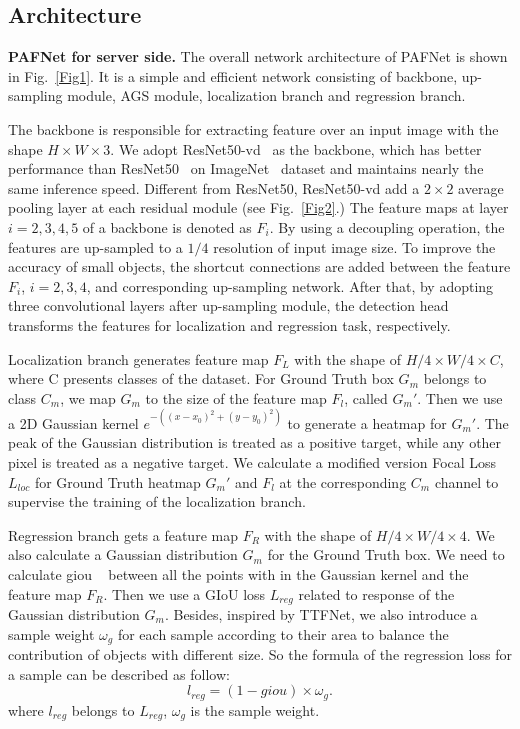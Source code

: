 \documentclass[10pt,twocolumn,letterpaper]{article}
\begin{document}
	\subsection{Architecture}
\textbf{PAFNet for server side.} The overall network architecture of PAFNet is shown in Fig.~\ref{Fig1}. It is a simple and efficient network consisting of backbone, up-sampling module, AGS module, localization branch and regression branch.
    
The backbone is responsible for extracting feature over an input image with the shape ${H \times W \times 3}$. We adopt ResNet50-vd~\cite{long2020pp} as the backbone, which has better performance than ResNet50~\cite{theckedath2020detecting} on ImageNet~\cite{deng2009imagenet} dataset and maintains nearly the same inference speed. Different from ResNet50, ResNet50-vd add a $2 \times 2$ average pooling layer at each residual module (see Fig.~\ref{Fig2}.) The feature maps at layer ${i=2,3,4,5}$ of a backbone is denoted as ${F_i}$. By using a decoupling operation, the features are up-sampled to a ${1/4}$ resolution of input image size. To improve the accuracy of small objects, the shortcut connections are added between the feature ${F_i}$, ${i=2,3,4}$, and corresponding up-sampling network. After that, by adopting three convolutional layers after up-sampling module, the detection head transforms the features for localization and regression task, respectively.
    
Localization branch generates feature map $F_L$ with the shape of ${H/4 \times W/4 \times C}$, where C presents classes of the dataset. For Ground Truth box ${G_m}$ belongs to class ${C_m}$, we map ${G_m}$ to the size of the feature map $F_l$, called ${G_m'}$. Then we use a 2D Gaussian kernel $e^{-((x-x_0)^2+(y-y_0)^2)}$ to generate a heatmap for ${G_m'}$. The peak of the Gaussian distribution is treated as a positive target, while any other pixel is treated as a negative target. We calculate a modified version Focal Loss~\cite{lin2017focal}${L_{loc}}$ for Ground Truth heatmap ${G_m'}$ and $F_l$ at the corresponding ${C_m}$ channel to supervise the training of the localization branch. 

Regression branch gets a feature map $F_R$ with the shape of ${H/4 \times W/4 \times 4}$. We also calculate a Gaussian distribution ${G_m}$ for the Ground Truth box. We need to calculate giou ~\cite{rezatofighi2019generalized} between all the points with in the Gaussian kernel and the feature map $F_R$. Then we use a GIoU loss ${L_{reg}}$ related to response of the Gaussian distribution ${G_m}$. Besides, inspired by TTFNet, we also introduce a sample weight ${{\omega}_g}$ for each sample according to their area to balance the contribution of objects with different size.
    So the formula of the regression loss for a sample can be described as follow:
    \begin{equation}
    \label{eq1}
    l_{reg} = (1 - giou) \times {\omega}_g.
    \end{equation}
    where $l_{reg}$ belongs to ${L_{reg}}$,  ${\omega}_g$ is the sample weight.
\end{document}
